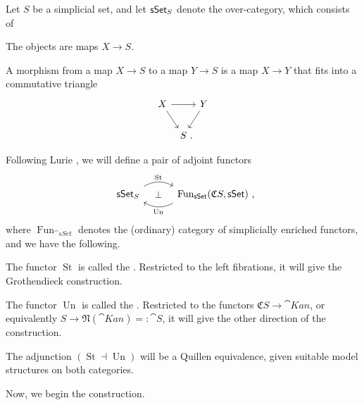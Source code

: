 Let $S$ be a simplicial set,
and let $\textup{\textsf{sSet}}_{\/S}$ denote the over-category, which consists of
\begin{itms}
    \item The objects are maps $X\to S$.
    \item A morphism from a map $X\to S$ to a map $Y\to S$ is a map $X\to Y$
    that fits into a commutative triangle
    \[\begin{tikzcd}[column sep=.5em]
        X\ar[rr]\ar[dr] && Y\ar[dl] \\
        & S\rlap{\ .}
    \end{tikzcd}\]
\end{itms}
Following Lurie \cite{htt}, we will define a pair of adjoint functors
\[\begin{tikzcd}[column sep=3em]
    \cat{sSet}_{\/S}\ar[r,bend left,start anchor=north east,end anchor=north west,"\operatorname{St}"]
    \ar[r,phantom,"\bot"] &
    \operatorname{Fun}_{\cat{sSet}}(\mathfrak CS,\cat{sSet})\rlap{\ ,}
    \ar[l,bend left,start anchor=south west,end anchor=south east,"\operatorname{Un}"]
\end{tikzcd}\]
where $\operatorname{Fun}_{\cat{sSet}}$
denotes the (ordinary) category of simplicially enriched functors,
and we have the following.

\begin{itms}
    \item The functor $\operatorname{St}$ is called the .
    Restricted to the left fibrations, it will give the Grothendieck construction.
    \item The functor $\operatorname{Un}$ is called the .
    Restricted to the functors $\mathfrak CS\to\cat{Kan}$,
    or equivalently $S\to\mathfrak N(\cat{Kan})=:\cat{S}$,
    it will give the other direction of the construction.
    \item The adjunction $(\operatorname{St}\dashv\operatorname{Un})$
    will be a Quillen equivalence, given suitable model structures on both categories.
\end{itms}

Now, we begin the construction.

